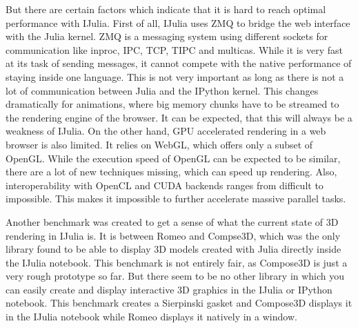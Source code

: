 But there are certain factors which indicate that it is hard to reach optimal performance with IJulia.
First of all, IJulia uses ZMQ to bridge the web interface with the Julia kernel.
ZMQ is a messaging system using different sockets for communication like inproc, IPC, TCP, TIPC and multicas.
While it is very fast at its task of sending messages, it cannot compete with the native performance of staying inside one language.
This is not very important as long as there is not a lot of communication between Julia and the IPython kernel. This changes dramatically for animations, where big memory chunks have to be streamed to the rendering engine of the browser. It can be expected, that this will always be a weakness of IJulia.
On the other hand, \ac{GPU} accelerated rendering in a web browser is also limited.
It relies on \ac{WebGL}, which offers only a subset of OpenGL. While the execution speed of OpenGL can be expected to be similar, there are a lot of new techniques missing, which can speed up rendering. Also, interoperability with \ac{OpenCL} and \ac{CUDA} backends ranges from difficult to impossible. 
This makes it impossible to further accelerate massive parallel tasks.

Another benchmark was created to get a sense of what the current state of 3D rendering in IJulia is.
It is between Romeo and Compse3D, which was the only library found to be able to display 3D models created with Julia directly inside the IJulia notebook.
This benchmark is not entirely fair, as Compose3D is just a very rough prototype so far. 
But there seem to be no other library in which you can easily create and display interactive 3D graphics in the IJulia or IPython notebook. 
This benchmark creates a Sierpinski gasket and Compose3D displays it in the IJulia notebook while Romeo displays it natively in a window.

